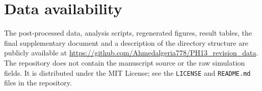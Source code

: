 \documentclass[11pt]{article}
\newcommand{\tabbox}[1]{\resizebox{\ifdim\width>\textwidth\textwidth\else\width\fi}{!}{#1}}
\begin{document}
\begin{table}[H]
\centering
\caption{Dissipation on a core support of fixed physical wall thickness, $D_{\rm core}(\delta)=2\nu\sum_{M\cap\{\mathrm{dist}(x,\Gamma)>\delta\}}S:S\,\Delta x^2$, with $\mathrm{dist}$ the exact distance to the superellipse boundary ($n=4$, $Re=1000$). $\delta=0.05$ and $0.1$ ($L_c=2$). Observed orders use successive doublings. This diagnostic separates the wall-support effect from the resolved-gradient drift and is not a continuum certification.}
\label{tab:dcore}
\tabbox{}
\end{table}
\par

\section*{Data availability}
The post-processed data, analysis scripts, regenerated figures, result tables,
the final supplementary document and a description of the directory structure
are publicly available at
\url{https://github.com/Ahmedalgeria778/PH13_revision_data}. The repository
does not contain the manuscript source or the raw simulation fields. It is
distributed under the MIT License; see the \texttt{LICENSE} and \texttt{README.md}
files in the repository.
\end{document}
